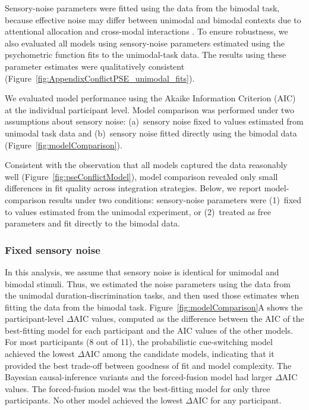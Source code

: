 \documentclass[9pt,lineno,doublespacing]{elife}
\begin{document}
Sensory-noise parameters were fitted using the data from the bimodal task, because effective noise may differ between unimodal and bimodal contexts due to attentional allocation and cross-modal interactions \citep{badde2020modality}. To ensure robustness, we also evaluated all models using sensory-noise parameters estimated using the psychometric function fits to the unimodal-task data. The results using these parameter estimates were qualitatively consistent (Figure~\ref{fig:AppendixConflictPSE_unimodal_fits}).

We evaluated model performance using the Akaike Information Criterion (AIC) at the individual participant level. Model comparison was performed under two assumptions about sensory noise: (a)~sensory noise fixed to values estimated from unimodal task data and (b)~sensory noise fitted directly using the bimodal data (Figure~\ref{fig:modelComparison}).

Consistent with the observation that all models captured the data reasonably well (Figure~\ref{fig:pseConflictModel}), model comparison revealed only small differences in fit quality across integration strategies. Below, we report model-comparison results under two conditions: sensory-noise parameters were (1)~fixed to values estimated from the unimodal experiment, or (2)~treated as free parameters and fit directly to the bimodal data.

\subsubsection{Fixed sensory noise}
In this analysis, we assume that sensory noise is identical for unimodal and bimodal stimuli. Thus, we estimated the noise parameters using the data from the unimodal duration-discrimination tasks, and then used those estimates when fitting the data from the bimodal task. Figure~\ref{fig:modelComparison}A shows the participant-level $\Delta$AIC values, computed as the difference between the AIC of the best-fitting model for each participant and the AIC values of the other models. For most participants (8 out of 11), the probabilistic cue-switching model achieved the lowest $\Delta$AIC among the candidate models, indicating that it provided the best trade-off between goodness of fit and model complexity. The Bayesian causal-inference variants and the forced-fusion model had larger $\Delta$AIC values. The forced-fusion model was the best-fitting model for only three participants. No other model achieved the lowest $\Delta$AIC for any participant.
\end{document}
